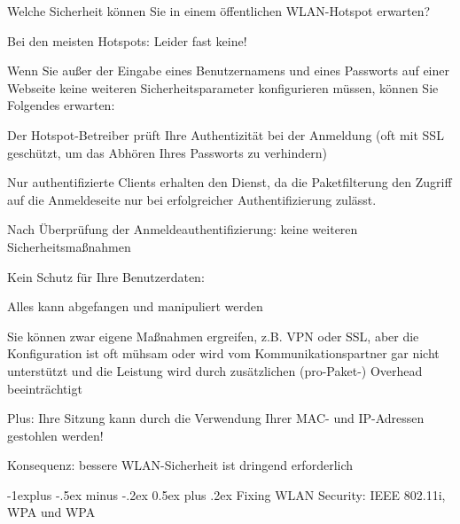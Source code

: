 \documentclass[a4paper]{article}
\makeatletter
\renewcommand{\subsection}{\@startsection{subsection}{2}{0mm}%
 {-1explus -.5ex minus -.2ex}%
 {0.5ex plus .2ex}%
 {\normalfont\normalsize\bfseries}}
\makeatother
\begin{document}
\begin{multicols}{3}
      Welche Sicherheit können Sie in einem öffentlichen WLAN-Hotspot
      erwarten?

      \begin{itemize*}
            \item Bei den meisten Hotspots: Leider fast keine!
            \item Wenn Sie außer der Eingabe eines Benutzernamens und eines Passworts
            auf einer Webseite keine weiteren Sicherheitsparameter konfigurieren
            müssen, können Sie Folgendes erwarten:
            \begin{itemize*}
                  \item Der Hotspot-Betreiber prüft Ihre Authentizität bei der Anmeldung (oft mit SSL geschützt, um das Abhören Ihres Passworts zu verhindern)
                  \item Nur authentifizierte Clients erhalten den Dienst, da die Paketfilterung den Zugriff auf die Anmeldeseite nur bei erfolgreicher Authentifizierung zulässt.
                  \item Nach Überprüfung der Anmeldeauthentifizierung: keine weiteren Sicherheitsmaßnahmen
                  \item Kein Schutz für Ihre Benutzerdaten:
                  \begin{itemize*} \item Alles kann abgefangen und manipuliert werden \item Sie können zwar eigene Maßnahmen ergreifen, z.B. VPN oder SSL, aber die Konfiguration ist oft mühsam oder wird vom Kommunikationspartner gar nicht unterstützt und die Leistung wird durch zusätzlichen (pro-Paket-) Overhead beeinträchtigt \end{itemize*}
                  \item Plus: Ihre Sitzung kann durch die Verwendung Ihrer MAC- und IP-Adressen gestohlen werden!
            \end{itemize*}
            \item Konsequenz: bessere WLAN-Sicherheit ist dringend erforderlich
      \end{itemize*}


      \subsection{Fixing WLAN Security: IEEE 802.11i, WPA und
            WPA}


\end{multicols}
\end{document}

